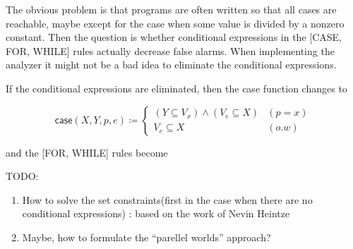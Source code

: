 \documentclass{article}
\begin{document}
The obvious problem is that programs are often written so that all cases are reachable, maybe except for the case when some value is divided by a nonzero constant. Then the question is whether conditional expressions in the [CASE, FOR, WHILE] rules actually decrease false alarms. When implementing the analyzer it might not be a bad idea to eliminate the conditional expressions.

If the conditional expressions are eliminated, then the case function changes to

\[
\mathsf{case}(X,Y,p,e)\coloneq
\begin{cases}
  (Y\subseteq V_{x})\wedge (V_{e}\subseteq X) & (p=x)\\
  V_{e} \subseteq X & (o.w)
\end{cases}
\]

and the [FOR, WHILE] rules become

\begin{center}
\begin{prooftree}
\end{prooftree}
\vspace{0.2cm}

\begin{prooftree}
\end{prooftree}
\end{center}

TODO:
\begin{enumerate}
  \item How to solve the set constraints(first in the case when there are no conditional expressions) : based on the work of Nevin Heintze\cite{Hei91}
  \item Maybe, how to formulate the ``parellel worlds'' approach?
\end{enumerate}
\printbibliography
\end{document}
